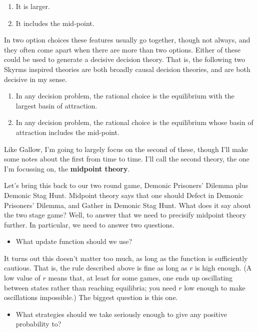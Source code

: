 \documentclass[
  12pt,
]{article}
\providecommand{\tightlist}{%
  \setlength{\itemsep}{0pt}\setlength{\parskip}{0pt}}
\begin{document}
\begin{enumerate}
\def\labelenumi{\arabic{enumi}.}
\tightlist
\item
  It is larger.
\item
  It includes the mid-point.
\end{enumerate}

In two option choices these features usually go together, though not
always, and they often come apart when there are more than two options.
Either of these could be used to generate a decisive decision theory.
That is, the following two Skyrms inspired theories are both broadly
causal decision theories, and are both decisive in my sense.

\begin{enumerate}
\def\labelenumi{\arabic{enumi}.}
\tightlist
\item
  In any decision problem, the rational choice is the equilibrium with
  the largest basin of attraction.
\item
  In any decision problem, the rational choice is the equilibrium whose
  basin of attraction includes the mid-point.
\end{enumerate}

Like Gallow, I'm going to largely focus on the second of these, though
I'll make some notes about the first from time to time. I'll call the
second theory, the one I'm focussing on, the \textbf{midpoint theory}.

Let's bring this back to our two round game, Demonic Prisoners' Dilemma
plus Demonic Stag Hunt. Midpoint theory says that one should Defect in
Demonic Prisoners' Dilemma, and Gather in Demonic Stag Hunt. What does
it say about the two stage game? Well, to answer that we need to
precisify midpoint theory further. In particular, we need to answer two
questions.

\begin{itemize}
\tightlist
\item
  What update function should we use?
\end{itemize}

It turns out this doesn't matter too much, as long as the function is
sufficiently cautious. That is, the rule described above is fine as long
as \(r\) is high enough. (A low value of \(r\) means that, at least for
some games, one ends up oscillating between states rather than reaching
equilibria; you need \(r\) low enough to make oscillations impossible.)
The biggest question is this one.

\begin{itemize}
\tightlist
\item
  What strategies should we take seriously enough to give any positive
  probability to?
\end{itemize}
\end{document}

